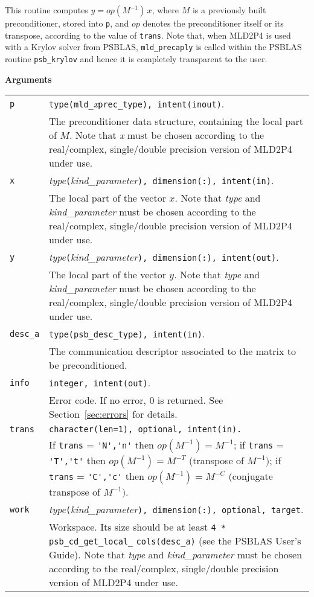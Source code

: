 \noindent
This routine computes $y = op(M^{-1})\, x$, where $M$ is a previously built
preconditioner, stored into \verb|p|, and $op$
denotes the preconditioner itself or its transpose, according to
the value of \verb|trans|.
Note that, when MLD2P4 is used with a Krylov solver from PSBLAS,
\verb|mld_precaply| is called within the PSBLAS routine \verb|psb_krylov|
and hence it is completely transparent to the user.

{\baselineskip\noindent\large\bfseries Arguments}

\begin{tabular}{p{1.2cm}p{12cm}}
\verb|p|      & \verb|type(mld_|\emph{x}\verb|prec_type), intent(inout)|.\\
              & The preconditioner data structure, containing the local part of $M$.
                Note that \emph{x} must be chosen according
                to the real/complex, single/double precision version of MLD2P4 under use.\\
\verb|x|      & \emph{type}\verb|(|\emph{kind\_parameter}\verb|), dimension(:), intent(in)|.\\
              & The local part of the vector $x$. Note that \emph{type} and   
                \emph{kind\_parameter} must be chosen according
                to the real/complex, single/double precision version of MLD2P4 under use.\\
\verb|y|      & \emph{type}\verb|(|\emph{kind\_parameter}\verb|), dimension(:), intent(out)|.\\
              & The local part of the vector $y$. Note that \emph{type} and
                \emph{kind\_parameter} must be chosen according
                to the real/complex, single/double precision version of MLD2P4 under use.\\
\verb|desc_a| & \verb|type(psb_desc_type), intent(in)|. \\
              & The communication descriptor associated to the matrix to be
                preconditioned.\\
\verb|info|   & \verb|integer, intent(out)|.\\
              & Error code. If no error, 0 is returned. See Section~\ref{sec:errors} for details.\\
\verb|trans|  & \verb|character(len=1), optional, intent(in).|\\
              & If \verb|trans| = \verb|'N','n'| then $op(M^{-1}) = M^{-1}$;
                if \verb|trans| = \verb|'T','t'| then $op(M^{-1}) = M^{-T}$
                (transpose of $M^{-1})$;  if \verb|trans| = \verb|'C','c'| then $op(M^{-1}) = M^{-C}$
                (conjugate transpose of $M^{-1})$.\\
\verb|work|  & \emph{type}\verb|(|\emph{kind\_parameter}\verb|), dimension(:), optional, target|.\\
             & Workspace. Its size should be at
               least \verb|4 * psb_cd_get_local_| \verb|cols(desc_a)| (see the PSBLAS User's Guide).
               Note that \emph{type} and \emph{kind\_parameter} must be chosen according
               to the real/complex, single/double precision version of MLD2P4 under use.\\
\end{tabular}


